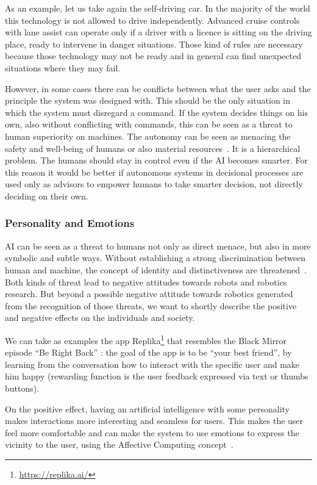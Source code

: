 As an example, let us take again the self-driving car. In the majority of the world this technology is not allowed to drive independently. Advanced cruise controls with lane assist can operate only if a driver with a licence is sitting on the driving place, ready to intervene in danger situations. Those kind of rules are necessary because those technology may not be ready and in general can find unexpected situations where they may fail.

However, in some cases there can be conflicts between what the user asks and the principle the system was designed with. This should be the only situation in which the system must disregard a command. If the system decides things on his own, also without conflicting with commands, this can be seen as a threat to human superiority on machines. The autonomy can be seen as menacing the safety and well-being of humans or also material resources~\cite{zlotowski2017can}. It is a hierarchical problem. The humans should stay in control even if the AI becomes smarter. For this reason it would be better if autonomous systems in decisional processes are used only as advisors to empower humans to take smarter decision, not directly deciding on their own.

\subsubsection{Personality and Emotions}
AI can be seen as a threat to humans not only as direct menace, but also in more symbolic and subtle ways. Without establishing a strong discrimination between human and machine, the concept of identity and distinctiveness are threatened~\cite{zlotowski2017can}. Both kinds of threat lead to negative attitudes towards robots and robotics research. But beyond a possible negative attitude towards robotics generated from the recognition of those threats, we want to shortly describe the positive and negative effects on the individuals and society.

We can take as examples the app Replika\footnote{\url{https://replika.ai/}} that resembles the Black Mirror episode ``Be Right Back'' : the goal of the app is to be ``your best friend'', by learning from the conversation how to interact with the specific user and make him happy (rewarding function is the user feedback expressed via text or thumbs buttons).

On the positive effect, having an artificial intelligence with some personality makes interactions more interesting and seamless for users. This makes the user feel more comfortable and can make the system to use emotions to express the vicinity to the user, using the Affective Computing concept~\cite{picard2000affective}.

